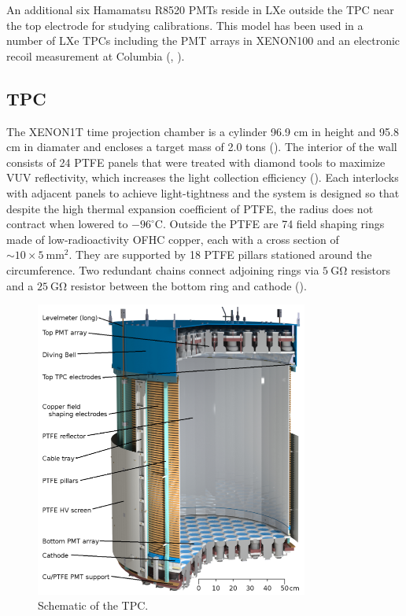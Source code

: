 An additional six Hamamatsu R8520 PMTs reside in LXe outside the TPC near the top electrode for studying calibrations.  This model has
been used in a number of LXe TPCs including the PMT arrays in XENON100 and an electronic recoil measurement at
Columbia (, ).




\subsection{TPC}
\label{subsec:xenon1t_tpc}
The XENON1T time projection chamber is a cylinder 96.9 cm in height and 95.8 cm in diamater and encloses a target mass of 2.0 tons
().  The interior of the wall consists of 24 PTFE panels that were treated with diamond tools to
maximize VUV reflectivity, which increases the light collection efficiency ().  Each interlocks with adjacent panels
to achieve light-tightness and the system is designed so that despite the high thermal expansion coefficient of PTFE, the radius does not
contract when lowered to $-96^{\circ}\mathrm{C}$.  Outside the PTFE are 74
field shaping rings made of low-radioactivity OFHC copper, each with a cross section of ${\sim} 10 \times 5\ \mathrm{mm^{2}}$.  They are
supported by 18 PTFE pillars stationed around the circumference.  Two redundant
chains connect adjoining rings via $5\ \mathrm{G \Omega}$ resistors and a $25\ \mathrm{G \Omega}$ resistor between the bottom ring and
cathode ().

\begin{figure}
\centering
\includegraphics[width=0.8\textwidth]{XENON1TTPC}
\caption{Schematic of the TPC.}
\label{fig:xenon1t_tpc_tpc}
\end{figure}

